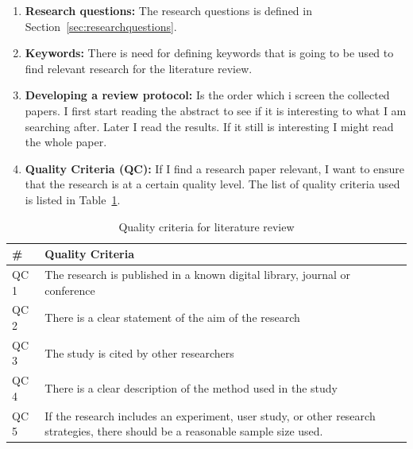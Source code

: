       \begin{enumerate}
        \item {\bf Research questions:} The research questions is defined in Section~\ref{sec:researchquestions}.
        \item {\bf Keywords:} There is need for defining keywords that is going to be used to find relevant research for the literature review. 
        \item {\bf Developing a review protocol:} Is the order which i screen the collected papers. I first start reading the abstract to see if it is interesting to what I am searching after. Later I read the results. If it still is interesting I might read the whole paper. 
        \item {\bf Quality Criteria (QC):} If I find a research paper relevant, I want to ensure that the research is at a certain quality level. The list of quality criteria used is listed in Table~\ref{tab:QualityCriteria}. 
      \end{enumerate}

      \begin{table}[H]
        \centering
        \begin{tabular}{| l | p{10cm} |}
          \hline
          {\bf \#} & {\bf Quality Criteria} \\ \hline
          QC 1 & The research is published in a known digital library, journal or conference\\ \hline
          QC 2 & There is a clear statement of the aim of the research\\ \hline
          QC 3 & The study is cited by other researchers\\ \hline
          QC 4 & There is a clear description of the method used in the study\\ \hline
          QC 5 & If the research includes an experiment, user study, or other research strategies, there should be a reasonable sample size used. \\ \hline
        \end{tabular}
        \caption{Quality criteria for literature review}
        \label{tab:QualityCriteria}
      \end{table}
    
